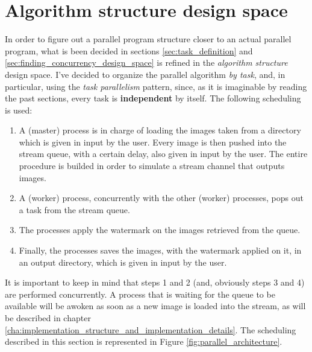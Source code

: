     \section{Algorithm structure design space} %
    \label{sec:algorithm_structure_design_space}
        In order to figure out a parallel program structure closer to an actual parallel program, what is been
        decided in sections \ref{sec:task_definition} and \ref{sec:finding_concurrency_design_space} is refined
        in the \textit{algorithm structure} design space. I've decided to organize the parallel algorithm
        \textit{by task}, and, in particular, using the \textit{task parallelism} pattern, since, as it is
        imaginable by reading the past sections, every task is \textbf{independent} by itself. The following
        scheduling is used:
        \begin{enumerate}
            \item A (master) process is in charge of loading the images taken from a directory which is given in
            input by the user. Every image is then pushed into the stream queue, with a certain delay, also
            given in input by the user. The entire procedure is builded in order to simulate a stream channel
            that outputs images.
            \item A (worker) process, concurrently with the other (worker) processes, pops out a task from the stream queue.
            \item The processes apply the watermark on the images retrieved from the queue.
            \item Finally, the processes saves the images, with the watermark applied on it, in an output
            directory, which is given in input by the user.
        \end{enumerate}
        It is important to keep in mind that steps 1 and 2 (and, obviously steps 3 and 4) are performed
        concurrently. A process that is waiting for the queue to be available will be awoken as soon as a new
        image is loaded into the stream, as will be described in chapter
        \ref{cha:implementation_structure_and_implementation_details}. The scheduling described in this section
        is represented in Figure \ref{fig:parallel_architecture}.

